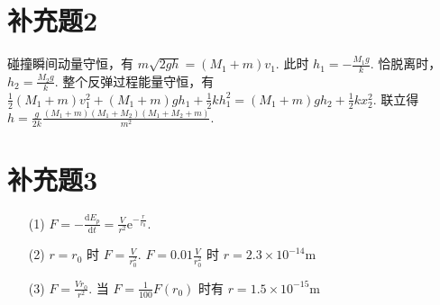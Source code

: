 \documentclass{article}
\newcommand{\dd}{\mathrm{d}}
\begin{document}
\section*{补充题2}

碰撞瞬间动量守恒，有 $m\sqrt{2gh} = (M_1 + m)v_1$. 此时 $h_1 = -\frac{M_1g}{k}$. 恰脱离时， $h_2 = \frac{M_2g}{k}$. 整个反弹过程能量守恒，有 $\frac{1}{2}(M_1 + m)v_1^2 + (M_1 + m)gh_1 + \frac{1}{2}kh_1^2 = (M_1 + m)gh_2 + \frac{1}{2}kx_2^2$. 联立得 $h = \frac{g}{2k}\frac{(M_1 + m)(M_1 + M_2)(M_1 + M_2 + m)}{m^2}$.

\section*{补充题3}

\begin{itemize}
    \item [(1)] $F = - \frac{\dd E_p}{\dd t} = \frac{V}{r^2}\mathrm{e}^{-\frac{r}{r_0}}$.
    \item [(2)] $r = r_0$ 时 $F = \frac{V}{r_0^2}$. $F = 0.01\frac{V}{r_0^2}$ 时 $r = 2.3 \times 10^{-14} \mathrm{m}$
    \item [(3)] $F = \frac{Vr_0}{r^2}$. 当 $F = \frac{1}{100}F(r_0)$ 时有 $r = 1.5 \times 10^{-15} \mathrm{m}$
\end{itemize}
\end{document}
